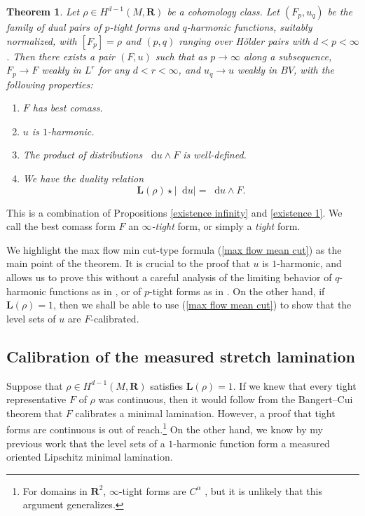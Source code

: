 \documentclass[reqno,11pt]{amsart}
\newcommand{\RR}{\mathbf{R}}
\newcommand*\dif{\mathop{}\!\mathrm{d}}
\newcommand{\Comass}{\mathbf L}
\newcommand{\dfn}[1]{\emph{#1}\index{#1}}
\newtheorem{mainthm}{Theorem}
\theoremstyle{definition}
\numberwithin{equation}{section}
\begin{document}
\begin{mainthm}\label{existence of infinity tight forms}
Let $\rho \in H^{d - 1}(M, \RR)$ be a cohomology class.
Let $(F_p, u_q)$ be the family of dual pairs of $p$-tight forms and $q$-harmonic functions, suitably normalized, with $[F_p] = \rho$ and $(p, q)$ ranging over H\"older pairs with $d < p < \infty$.
Then there exists a pair $(F, u)$ such that as $p \to \infty$ along a subsequence, $F_p \to F$ weakly in $L^r$ for any $d < r < \infty$, and $u_q \to u$ weakly in $BV$, with the following properties:
\begin{enumerate}
\item $F$ has best comass.
\item $u$ is $1$-harmonic.
\item The product of distributions $\dif u \wedge F$ is well-defined.
\item We have the duality relation
\begin{equation}\label{max flow mean cut}
\Comass(\rho) \star |\dif u| = \dif u \wedge F.
\end{equation}
\end{enumerate}
\end{mainthm}

This is a combination of Propositions \ref{existence infinity} and \ref{existence 1}.
We call the best comass form $F$ an \dfn{$\infty$-tight} form, or simply a \dfn{tight} form.

We highlight the max flow min cut-type formula (\ref{max flow mean cut}) as the main point of the theorem.
It is crucial to the proof that $u$ is $1$-harmonic, and allows us to prove this without a careful analysis of the limiting behavior of $q$-harmonic functions as in \cite[Theorem 2.4]{Mazon14}, or of $p$-tight forms as in \cite[\S6]{daskalopoulos2020transverse}.
On the other hand, if $\Comass(\rho) = 1$, then we shall be able to use (\ref{max flow mean cut}) to show that the level sets of $u$ are $F$-calibrated.


\subsection{Calibration of the measured stretch lamination}
Suppose that $\rho \in H^{d - 1}(M, \RR)$ satisfies $\Comass(\rho) = 1$.
If we knew that every tight representative $F$ of $\rho$ was continuous, then it would follow from the Bangert--Cui theorem that $F$ calibrates a minimal lamination.
However, a proof that tight forms are continuous is out of reach.\footnote{For domains in $\RR^2$, $\infty$-tight forms are $C^\alpha$ \cite{Evans08}, but it is unlikely that this argument generalizes.}
On the other hand, we know by my previous work \cite[Theorem C]{BackusCML} that the level sets of a $1$-harmonic function form a measured oriented Lipschitz minimal lamination.
\end{document}
